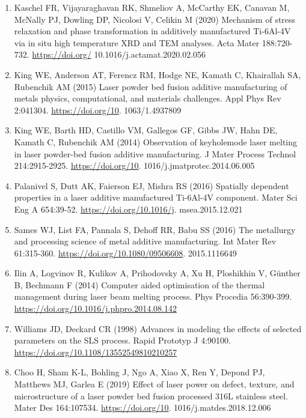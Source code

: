 \documentclass[10pt]{article}
\begin{document}
\begin{enumerate}
  \item Kaschel FR, Vijayaraghavan RK, Shmeliov A, McCarthy EK, Canavan M, McNally PJ, Dowling DP, Nicolosi V, Celikin M (2020) Mechanism of stress relaxation and phase transformation in additively manufactured Ti-6Al-4V via in situ high temperature XRD and TEM analyses. Acta Mater 188:720-732. \href{https://doi.org/}{https://doi.org/} 10.1016/j.actamat.2020.02.056

  \item King WE, Anderson AT, Ferencz RM, Hodge NE, Kamath C, Khairallah SA, Rubenchik AM (2015) Laser powder bed fusion additive manufacturing of metals physics, computational, and materials challenges. Appl Phys Rev 2:041304. \href{https://doi.org/10}{https://doi.org/10}. 1063/1.4937809

  \item King WE, Barth HD, Castillo VM, Gallegos GF, Gibbs JW, Hahn DE, Kamath C, Rubenchik AM (2014) Observation of keyholemode laser melting in laser powder-bed fusion additive manufacturing. J Mater Process Technol 214:2915-2925. \href{https://doi.org/10}{https://doi.org/10}. 1016/j.jmatprotec.2014.06.005

  \item Palanivel S, Dutt AK, Faierson EJ, Mishra RS (2016) Spatially dependent properties in a laser additive manufactured Ti-6Al-4V component. Mater Sci Eng A 654:39-52. \href{https://doi.org/10.1016/j}{https://doi.org/10.1016/j}. msea.2015.12.021

  \item Sames WJ, List FA, Pannala S, Dehoff RR, Babu SS (2016) The metallurgy and processing science of metal additive manufacturing. Int Mater Rev 61:315-360. \href{https://doi.org/10.1080/09506608}{https://doi.org/10.1080/09506608}. 2015.1116649

  \item Ilin A, Logvinov R, Kulikov A, Prihodovsky A, Xu H, Ploshikhin V, Günther B, Bechmann F (2014) Computer aided optimisation of the thermal management during laser beam melting process. Phys Procedia 56:390-399. \href{https://doi.org/10.1016/j.phpro.2014.08.142}{https://doi.org/10.1016/j.phpro.2014.08.142}

  \item Williams JD, Deckard CR (1998) Advances in modeling the effects of selected parameters on the SLS process. Rapid Prototyp J 4:90100. \href{https://doi.org/10.1108/13552549810210257}{https://doi.org/10.1108/13552549810210257}

  \item Choo H, Sham K-L, Bohling J, Ngo A, Xiao X, Ren Y, Depond PJ, Matthews MJ, Garlea E (2019) Effect of laser power on defect, texture, and microstructure of a laser powder bed fusion processed 316L stainless steel. Mater Des 164:107534. \href{https://doi.org/10}{https://doi.org/10}. 1016/j.matdes.2018.12.006


\end{enumerate}
\end{document}
